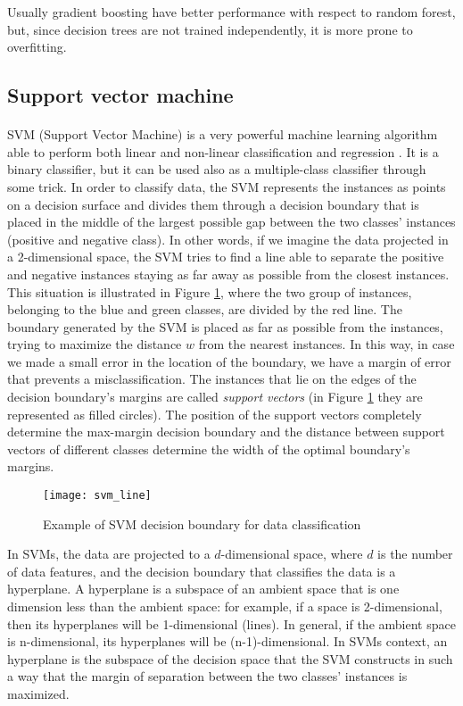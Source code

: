 Usually gradient boosting have better performance with respect to random forest, but, since decision trees are not trained independently, it is more prone to overfitting.

\subsection{Support vector machine}
\paragraph{} SVM (Support Vector Machine) is a very powerful machine learning algorithm able to perform both linear and non-linear classification and regression \cite{OReilly:handsonML}. It is a binary classifier, but it can be used also as a multiple-class classifier through some trick. In order to classify data, the SVM represents the instances as points on a decision surface and divides them through a decision boundary that is placed in the middle of the largest possible gap between the two classes' instances (positive and negative class). In other words, if we imagine the data projected in a 2-dimensional space, the SVM tries to find a line able to separate the positive and negative instances staying as far away as possible from the closest instances. This situation is illustrated in Figure \ref{fig:svm_line}, where the two group of instances, belonging to the blue and green classes, are divided by the red line. The boundary generated by the SVM is placed as far as possible from the instances, trying to maximize the distance $w$ from the nearest instances. In this way, in case we made a small error in the location of the boundary, we have a margin of error that prevents a misclassification. The instances that lie on the edges of the decision boundary's margins are called \textit{support vectors} (in Figure \ref{fig:svm_line} they are represented as filled circles). The position of the support vectors completely determine the max-margin decision boundary and the distance between support vectors of different classes determine the width of the optimal boundary’s margins.
\begin{figure}[htbp]
    \centering
    \texttt{[image: svm\_line]}
    \caption{Example of SVM decision boundary for data classification}
    \label{fig:svm_line}
\end{figure}

In SVMs, the data are projected to a $d$-dimensional space, where $d$ is the number of data features, and the decision boundary that classifies the data is a hyperplane. A hyperplane is a subspace of an ambient space that is one dimension less than the ambient space: for example, if a space is 2-dimensional, then its hyperplanes will be 1-dimensional (lines). In general, if the ambient space is n-dimensional, its hyperplanes will be (n-1)-dimensional. In SVMs context, an hyperplane is the subspace of the decision space that the SVM constructs in such a way that the margin of separation between the two classes' instances is maximized.

